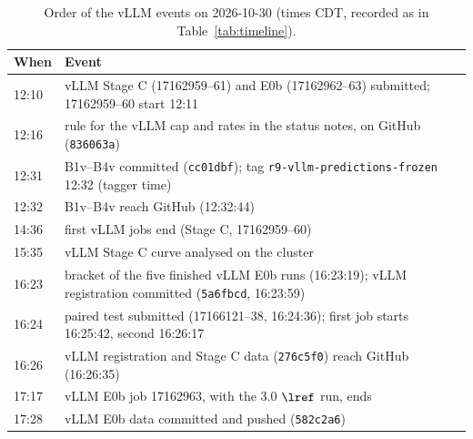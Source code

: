 \begin{table}[htbp]
\centering\footnotesize
\caption{Order of the vLLM events on 2026-10-30 (times CDT, recorded as in Table~\ref{tab:timeline}).}\label{tab:timeline-vllm}
\begin{tabular}{@{}p{1.75cm} >{\raggedright\arraybackslash}p{5.6cm}@{}}
\toprule
When & Event\\
\midrule
12:10 & vLLM Stage C (17162959--61) and E0b (17162962--63) submitted; 17162959--60 start 12:11\\
12:16 & rule for the vLLM cap and rates in the status notes, on GitHub (\texttt{836063a})\\
12:31 & B1v--B4v committed (\texttt{cc01dbf}); tag \texttt{r9-vllm-predictions-frozen} 12:32 (tagger time)\\
12:32 & B1v--B4v reach GitHub (12:32:44)\\
14:36 & first vLLM jobs end (Stage C, 17162959--60)\\
15:35 & vLLM Stage C curve analysed on the cluster\\
16:23 & bracket of the five finished vLLM E0b runs (16:23:19); vLLM registration committed (\texttt{5a6fbcd}, 16:23:59)\\
16:24 & paired test submitted (17166121--38, 16:24:36); first job starts 16:25:42, second 16:26:17\\
16:26 & vLLM registration and Stage C data (\texttt{276c5f0}) reach GitHub (16:26:35)\\
17:17 & vLLM E0b job 17162963, with the 3.0 $\lref$ run, ends\\
17:28 & vLLM E0b data committed and pushed (\texttt{582c2a6})\\
\bottomrule
\end{tabular}
\end{table}

